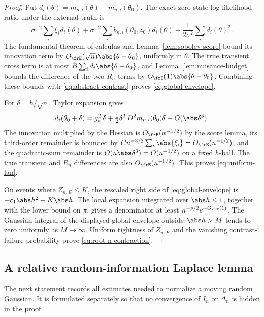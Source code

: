 \begin{proof}
Put \(d_i(\theta)=m_{n,i}(\theta)-m_{n,i}(\theta_0)\).  The exact zero-state
log-likelihood ratio under the external truth is
\begin{equation}
 \sigma^{-2}\sum_i\xi_i d_i(\theta)
 +\sigma^{-2}\sum_i b_{n,i}(\theta_0,z_0)d_i(\theta)
 -\frac1{2\sigma^2}\sum_i d_i(\theta)^2.
 \label{eq:exact-zero-state-ratio}
\end{equation}
The fundamental theorem of calculus and
Lemma~\ref{lem:sobolev-score} bound its innovation term by
\(O_{\frE}(\sqrt n)\abs{\theta-\theta_0}\), uniformly in \(\theta\).  The
true transient cross term is at most
\(B\sum_i d_i\abs{\theta-\theta_0}\), and
Lemma~\ref{lem:nuisance-budget} bounds the difference of the two \(R_n\)
terms by \(O_{\frE}(1)\abs{\theta-\theta_0}\).  Combining these bounds with
\eqref{eq:abstract-contrast} proves \eqref{eq:global-envelope}.

For \(\delta=h/\sqrt n\), Taylor expansion gives
\[
 d_i(\theta_0+\delta)=g_i^T\delta
 +\tfrac12\delta^TD^2m_{n,i}(\theta_0)\delta+O(\abs\delta^3).
\]
The innovation multiplied by the Hessian is \(O_{\frE}(n^{-1/2})\) by the
score lemma, its third-order remainder is bounded by
\(Cn^{-3/2}\sum_i\abs{\xi_i}=O_{\frE}(n^{-1/2})\), and the quadratic-sum
remainder is \(O(n\abs\delta^3)=O(n^{-1/2})\) on a fixed \(h\)-ball.  The
true transient and \(R_n\) differences are also \(O_{\frE}(n^{-1/2})\).
This proves \eqref{eq:uniform-lan}.

On events where \(Z_{n,E}\le K\), the rescaled right side of
\eqref{eq:global-envelope} is \(-c_1\abs h^2+K\abs h\).  The local expansion
integrated over \(\abs h\le1\), together with the lower bound on \(\pi\),
gives a denominator at least \(n^{-p/2}e^{-O_{\frE}(1)}\).  The Gaussian
integral of the displayed global envelope outside \(\abs h>M\) tends to zero
uniformly as \(M\to\infty\).  Uniform tightness of \(Z_{n,E}\) and the
vanishing contrast-failure probability prove \eqref{eq:root-n-contraction}.
\end{proof}

\subsection{A relative random-information Laplace lemma}

The next statement records all estimates needed to normalize a moving random
Gaussian.  It is formulated separately so that no convergence of \(I_n\) or
\(\Delta_n\) is hidden in the proof.

